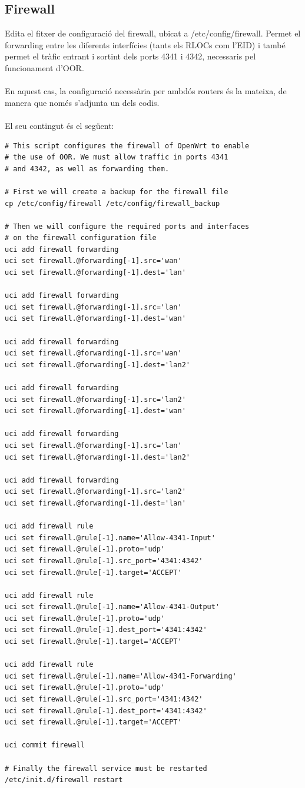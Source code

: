 \documentclass[11pt]{article}
\begin{document}
\subsection{Firewall}
Edita el fitxer de configuració del firewall, ubicat a /etc/config/firewall. Permet el forwarding entre les diferents interfícies (tants els RLOCs com l’EID) i també permet el tràfic entrant i sortint dels ports 4341 i 4342, necessaris pel funcionament d’OOR.\\
\\
En aquest cas, la configuració necessària per ambdós routers és la mateixa, de manera que només s'adjunta un dels codis.\\
\\
El seu contingut és el següent:\\
\lstset{caption=Script de configuració del firewall}
\begin{lstlisting}[frame=single]
# This script configures the firewall of OpenWrt to enable
# the use of OOR. We must allow traffic in ports 4341 
# and 4342, as well as forwarding them.

# First we will create a backup for the firewall file
cp /etc/config/firewall /etc/config/firewall_backup

# Then we will configure the required ports and interfaces 
# on the firewall configuration file
uci add firewall forwarding
uci set firewall.@forwarding[-1].src='wan'
uci set firewall.@forwarding[-1].dest='lan'

uci add firewall forwarding
uci set firewall.@forwarding[-1].src='lan'
uci set firewall.@forwarding[-1].dest='wan'

uci add firewall forwarding
uci set firewall.@forwarding[-1].src='wan'
uci set firewall.@forwarding[-1].dest='lan2'

uci add firewall forwarding
uci set firewall.@forwarding[-1].src='lan2'
uci set firewall.@forwarding[-1].dest='wan'

uci add firewall forwarding
uci set firewall.@forwarding[-1].src='lan'
uci set firewall.@forwarding[-1].dest='lan2'

uci add firewall forwarding
uci set firewall.@forwarding[-1].src='lan2'
uci set firewall.@forwarding[-1].dest='lan'

uci add firewall rule
uci set firewall.@rule[-1].name='Allow-4341-Input'
uci set firewall.@rule[-1].proto='udp'
uci set firewall.@rule[-1].src_port='4341:4342'
uci set firewall.@rule[-1].target='ACCEPT'

uci add firewall rule
uci set firewall.@rule[-1].name='Allow-4341-Output'
uci set firewall.@rule[-1].proto='udp'
uci set firewall.@rule[-1].dest_port='4341:4342'
uci set firewall.@rule[-1].target='ACCEPT'

uci add firewall rule
uci set firewall.@rule[-1].name='Allow-4341-Forwarding'
uci set firewall.@rule[-1].proto='udp'
uci set firewall.@rule[-1].src_port='4341:4342'
uci set firewall.@rule[-1].dest_port='4341:4342'
uci set firewall.@rule[-1].target='ACCEPT'

uci commit firewall

# Finally the firewall service must be restarted
/etc/init.d/firewall restart
\end{lstlisting}
\end{document}
